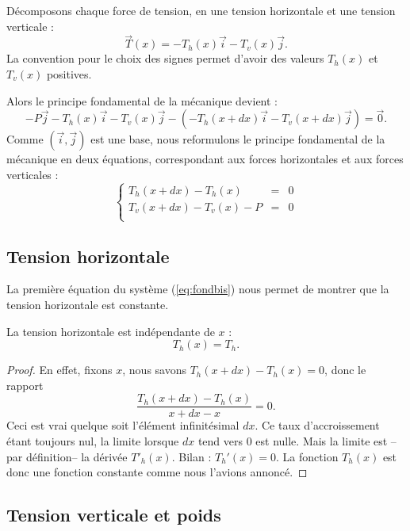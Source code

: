 \documentclass[class=report,crop=false]{standalone}
\begin{document}
Décomposons chaque force de tension, en une tension horizontale et une tension verticale :
$$\vec T(x) = -T_h(x)\vec i - T_v(x) \vec j.$$
La convention pour le choix des signes permet d'avoir des valeurs $T_h(x)$ et $T_v(x)$ positives.
\shorthandoff{:}
\shorthandon{:}

Alors le principe fondamental de la mécanique devient :
$$-P \vec j - T_h(x)\vec i - T_v(x) \vec j - \left( - T_h(x+dx)\vec i - T_v(x+dx)  \vec j \right) = \vec 0.$$
Comme $(\vec i,\vec j)$ est une base, nous reformulons le principe fondamental de la mécanique en deux équations, correspondant aux forces
horizontales et aux forces verticales :
\begin{equation}
\label{eq:fondbis}
\left\lbrace
\begin{array}{rcl}
T_h(x+dx)-T_h(x) &=& 0 \\
T_v(x+dx) - T_v(x) - P &=& 0 \\
\end{array}
\right.
\end{equation}

\subsection{Tension horizontale}
\label{ssec:Th}

La première équation du système (\ref{eq:fondbis}) nous permet de montrer
que la tension horizontale est constante.
\begin{lemme}
\label{lem:Th}
La tension horizontale est indépendante de $x$ :
$$T_h(x) = T_h.$$
\end{lemme}

\begin{proof}
En effet, fixons $x$, nous savons $T_h(x+dx)-T_h(x)=0$,
donc le rapport 
$$\frac{T_h(x+dx)-T_h(x)}{x+dx-x}=0.$$
Ceci est vrai quelque soit l'élément infinitésimal $dx$. 
Ce taux d'accroissement étant toujours nul, la limite lorsque $dx$ tend vers $0$ est nulle.
Mais la limite est --par définition-- la dérivée $T'_h(x)$.
Bilan : $T_h'(x)=0$. La fonction $T_h(x)$ est donc une fonction constante
comme nous l'avions annoncé.
\end{proof}


\subsection{Tension verticale et poids}
\end{document}
